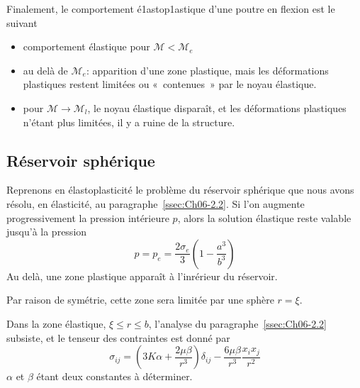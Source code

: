 Finalement, le comportement é1astop1astique d'une poutre en flexion est le suivant 
\begin{itemize}
    \item comportement élastique pour $\mathcal{M}<\mathcal{M}_e$
    \item au delà de $\mathcal{M}_e$: apparition d'une zone plastique, mais les déformations plastiques restent limitées ou «~contenues~» par le noyau élastique. 
    \item pour $\mathcal{M} \rightarrow \mathcal{M}_l$, le noyau élastique disparaît, et les déformations plastiques n'étant plus limitées, il y a ruine de la structure. 
\end{itemize}

\subsection{Réservoir sphérique} \label{ssec:Ch10-2.2}
Reprenons en élastoplasticité le problème du réservoir sphérique que nous avons résolu, en élasticité, au paragraphe~\ref{ssec:Ch06-2.2}.
Si l'on augmente progressivement la pression intérieure $p$, alors la solution élastique reste valable jusqu'à la pression 
\begin{equation}
    p = p_e = \frac{2\sigma_e}{3} \left( 1 - \frac{a^3}{b^3} \right)
    \label{eq:Ch10-032}
\end{equation}
Au delà, une zone plastique apparaît à l'inrérieur du réservoir. 
\begin{multicols}{2}
    \begin{center}
    \end{center}
    \columnbreak
    Par raison de symétrie, cette zone sera limitée par une sphère $r=\xi$.
\end{multicols}
Dans la zone élastique, $\xi \leq r \leq b$, l'analyse du paragraphe~\ref{ssec:Ch06-2.2} subsiste, et le tenseur des contraintes est donné par 
\begin{equation}
    \sigma_{ij} = \left( 3 K \alpha + \frac{2\mu \beta}{r^3} \right) \delta_{ij} - \frac{6\mu \beta}{r^3} \frac{x_ix_j}{r^2}
    \label{eq:Ch10-033}
\end{equation}
$\alpha$ et $\beta$ étant deux constantes à déterminer.

